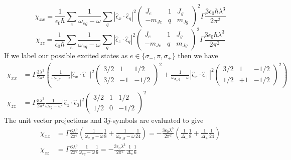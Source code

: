 \documentclass{article}[12pt]
\begin{document}
\[ \chi_{xx} = \frac{1}{\epsilon_{0}\hbar } \sum_{e}   \frac{1 }{\omega_{eg} -\omega}  \sum_{q} |\hat{\epsilon}_{x}\cdot \hat{\epsilon}_{q}|^{2} \begin{pmatrix} J_{e} & 1 & J_{g} \\ -m_{Je} & q & m_{Jg} \end{pmatrix}^{2}
\Gamma\frac{ 3\epsilon_{0} \hbar \lambda^{3}}{2 \pi^{2}} \]
\[ \chi_{zz} = \frac{1}{\epsilon_{0}\hbar } \sum_{e}   \frac{1 }{\omega_{eg} -\omega}  \sum_{q} |\hat{\epsilon}_{z}\cdot \hat{\epsilon}_{q}|^{2} \begin{pmatrix} J_{e} & 1 & J_{g} \\ -m_{Je} & q & m_{Jg} \end{pmatrix}^{2}
\Gamma\frac{ 3\epsilon_{0} \hbar \lambda^{3}}{2 \pi^{2}} \]
If we label our possible excited states as $e\in\{\sigma_{-}, \pi, \sigma_{+}\}$ then we have
\begin{align}
\chi_{xx} & = \Gamma\frac{ 3\lambda^{3}}{2 \pi^{2}} \left(   \frac{1 }{\omega_{\sigma_{-}g} -\omega}  |\hat{\epsilon}_{x}\cdot \hat{\epsilon}_{-}|^{2} \begin{pmatrix} 3/2 & 1 & 1/2 \\ 3/2 & -1 & -1/2 \end{pmatrix}^{2} 
+ \frac{1 }{\omega_{\sigma_{+}g} -\omega}  |\hat{\epsilon}_{x}\cdot \hat{\epsilon}_{+}|^{2} \begin{pmatrix} 3/2 & 1 & -1/2 \\ 1/2 & +1 & -1/2 \end{pmatrix}^{2} \right) \\
 \chi_{zz} & = \Gamma\frac{ 3  \lambda^{3}}{2 \pi^{2}}     \frac{1 }{\omega_{\pi g} -\omega}   |\hat{\epsilon}_{z}\cdot \hat{\epsilon}_{0}|^{2} \begin{pmatrix} 3/2 & 1 & 1/2 \\ 1/2 & 0 & -1/2 \end{pmatrix}^{2}
\end{align}
The unit vector projections and $3j$-symbols are evaluated to give
\begin{align}
\chi_{xx} & = \Gamma\frac{ 3 \lambda^{3}}{2 \pi^{2}} \left(   \frac{1 }{\omega_{\sigma_{-}g} -\omega}  \frac{1}{8} 
+ \frac{1 }{\omega_{\sigma_{+}g} -\omega} \frac{1}{24} \right)  
= - \frac{ 3\epsilon_{0} \lambda^{3}}{2 \pi^{2}} \left(   \frac{1 }{\Delta_{-}}  \frac{1}{8} + \frac{1 }{\Delta_{+}} \frac{1}{24}  \right) \\
 \chi_{zz} & = \Gamma\frac{ 3  \lambda^{3}}{2 \pi^{2}}     \frac{1 }{\omega_{\pi g} -\omega}    \frac{1}{6}
  = -\frac{ 3\epsilon_{0}  \lambda^{3}}{2 \pi^{2}}     \frac{1 }{\Delta_{\pi}}    \frac{1}{6}
\end{align}
\end{document}
